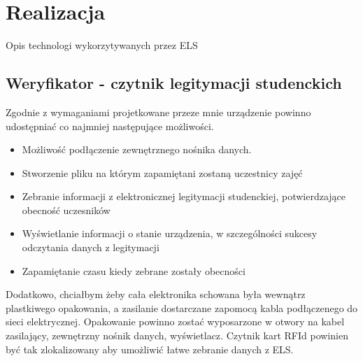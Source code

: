 \documentclass[declaration,shortabstract, mgr]{iithesis}
\begin{document}
\chapter{Realizacja}
Opis technologi wykorzytywanych przez ELS
\section{Weryfikator - czytnik legitymacji studenckich}
\indent Zgodnie z wymaganiami projetkowane przeze mnie urządzenie powinno udostępniać co najmniej następujące możliwości.
\begin{itemize}
\item Możliwość podłączenie zewnętrznego nośnika danych.
\item Stworzenie pliku na którym zapamiętani zostaną uczestnicy zajęć
\item Zebranie informacji z elektronicznej legitymacji studenckiej, potwierdzające obecność uczesników
\item Wyświetlanie informacji o stanie urządzenia, w szczególności sukcesy odczytania danych z legitymacji
\item Zapamiętanie czasu kiedy zebrane zostały obecności
\end{itemize}
\indent Dodatkowo, chciałbym żeby cała elektronika schowana była wewnątrz plastkiwego opakowania, a zasilanie dostarczane zapomocą kabla podłączenego do sieci elektrycznej. Opakowanie powinno zostać wyposarzone w otwory na kabel zasilający, zewnętrzny nośnik danych, wyświetlacz. Czytnik kart RFId powinien być tak zlokalizowany aby umożliwić łatwe zebranie danych z ELS.
\end{document}
